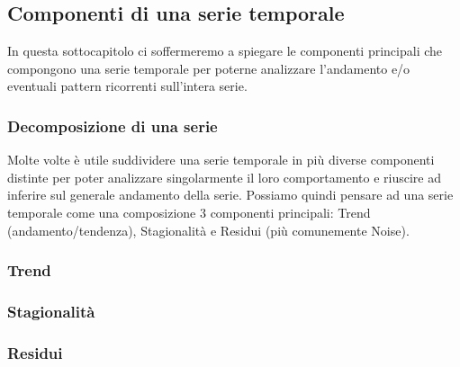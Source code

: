 \subsection{Componenti di una serie temporale}
In questa sottocapitolo ci soffermeremo a spiegare le componenti principali
che compongono una serie temporale per poterne analizzare l'andamento e/o
eventuali pattern ricorrenti sull'intera serie.

\subsubsection{Decomposizione di una serie}
Molte volte è utile suddividere una serie temporale in più diverse componenti
distinte per poter analizzare singolarmente il loro comportamento e
riuscire ad inferire sul generale andamento della serie. Possiamo quindi
pensare ad una serie temporale come una composizione 3 componenti principali:
Trend (andamento/tendenza), Stagionalità e Residui (più comunemente Noise).



\subsubsection{Trend}
\subsubsection{Stagionalità}
\subsubsection{Residui}

